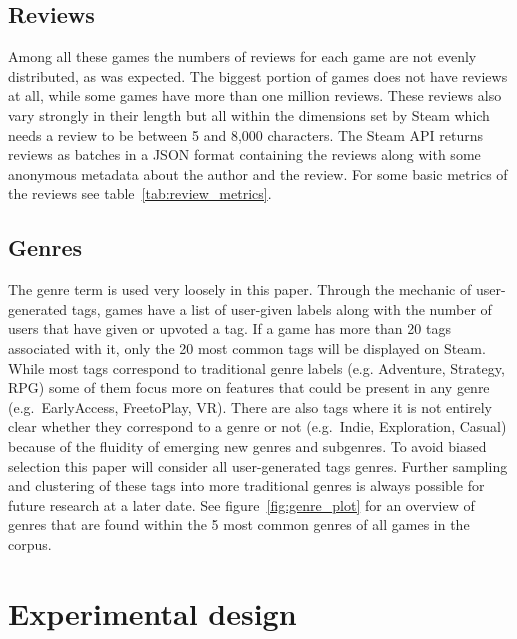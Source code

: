 \documentclass[11pt, a4paper]{article}
\begin{document}



\subsection{Reviews}\label{subsec:reviews}
Among all these games the numbers of reviews for each game are not evenly distributed, as was expected.
The biggest portion of games does not have reviews at all, while some games have more than one million reviews.
These reviews also vary strongly in their length but all within the dimensions set by Steam which needs a review to
be between 5 and 8,000 characters.
The Steam API returns reviews as batches in a JSON format containing the reviews along with some anonymous metadata
about the author and the review.
For some basic metrics of the reviews see table~\ref{tab:review_metrics}.




\subsection{Genres}\label{subsec:genres}
The genre term is used very loosely in this paper.
Through the mechanic of user-generated tags, games have a list of user-given labels along with the number of users
that have given or upvoted a tag.
If a game has more than 20 tags associated with it, only the 20 most common tags will be displayed on Steam.
While most tags correspond to traditional genre labels (e.g. Adventure, Strategy, RPG) some of them focus more on
features that could be present in any genre (e.g.\ EarlyAccess, FreetoPlay, VR). There are also tags where it is
not entirely clear whether they correspond to a genre or not (e.g.\ Indie, Exploration, Casual) because of the fluidity
of emerging new genres and subgenres.
To avoid biased selection this paper will consider all user-generated tags genres.
Further sampling and clustering of these tags into more traditional genres is always possible for future research at a
later date.
See figure~\ref{fig:genre_plot} for an overview of genres that are found within the 5 most common genres of all games
in the corpus.



\section{Experimental design}\label{sec:experimental-design}
\end{document}
